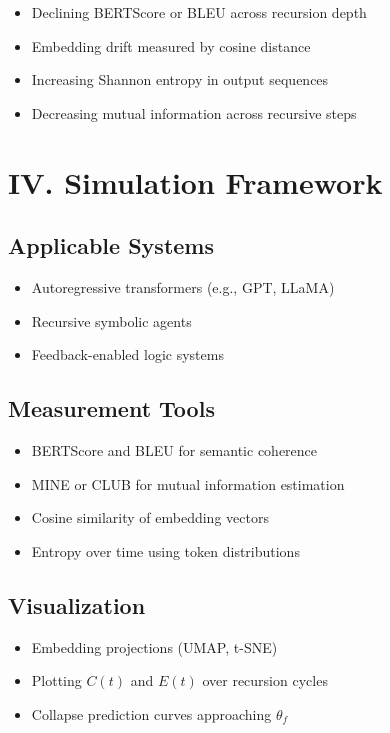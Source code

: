 \documentclass[12pt]{article}
\begin{document}
\begin{itemize}
  \item Declining BERTScore or BLEU across recursion depth
  \item Embedding drift measured by cosine distance
  \item Increasing Shannon entropy in output sequences
  \item Decreasing mutual information across recursive steps
\end{itemize}

\section*{IV. Simulation Framework}

\subsection*{Applicable Systems}

\begin{itemize}
  \item Autoregressive transformers (e.g., GPT, LLaMA)
  \item Recursive symbolic agents
  \item Feedback-enabled logic systems
\end{itemize}

\subsection*{Measurement Tools}

\begin{itemize}
  \item BERTScore and BLEU for semantic coherence
  \item MINE or CLUB for mutual information estimation
  \item Cosine similarity of embedding vectors
  \item Entropy over time using token distributions
\end{itemize}

\subsection*{Visualization}

\begin{itemize}
  \item Embedding projections (UMAP, t-SNE)
  \item Plotting $C(t)$ and $E(t)$ over recursion cycles
  \item Collapse prediction curves approaching $\theta_f$
\end{itemize}
\end{document}
